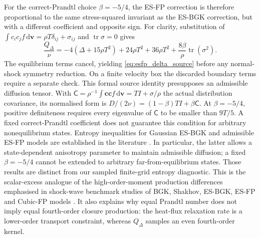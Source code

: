 \documentclass[lineno,paper]{JFM-FLM_Au}
\newenvironment{revision}{\nolinenumbers\begin{tcolorbox}[breakable,colback=revisionyellow,colframe=revisionyellow,boxrule=0pt,arc=0pt,left=5pt,right=5pt,top=5pt,bottom=5pt,before skip=6pt,after skip=6pt]\captionsetup{width=\linewidth}}{\end{tcolorbox}\linenumbers}
\newenvironment{revision}{}{}
\newcommand{\dd}{\mathrm{d}}
\newcommand{\tr}{\operatorname{tr}}
\begin{document}
\begin{revision}
For the correct-Prandtl choice $\beta=-5/4$, the ES-FP correction is therefore proportional to the same stress-squared invariant as the ES-BGK correction, but with a different coefficient and opposite sign. For clarity, substitution of $\int c_ic_jf\,\dd\boldsymbol v=\rho T\delta_{ij}+\sigma_{ij}$ and $\tr\sigma=0$ gives
\[
 \frac{Q_\Delta}{\nu}
 =-4(\Delta+15\rho T^2)+24\rho T^2+36\rho T^2
   +\frac{8\beta}{\rho}\tr(\sigma^2).
\]
The equilibrium terms cancel, yielding \eqref{eq:esfp_delta_source} before any normal-shock symmetry reduction. On a finite velocity box the discarded boundary terms require a separate check. This formal source identity presupposes an admissible diffusion tensor. With $\mathsf C=\rho^{-1}\int\boldsymbol c\boldsymbol c f\,\dd\boldsymbol v=TI+\sigma/\rho$ the actual distribution covariance, its normalised form is $D/(2\nu)=(1-\beta)TI+\beta\mathsf C$. At $\beta=-5/4$, positive definiteness requires every eigenvalue of $\mathsf C$ to be smaller than $9T/5$. A fixed correct-Prandtl coefficient does not guarantee this condition for arbitrary nonequilibrium states.  Entropy inequalities for Gaussian ES-BGK and admissible ES-FP models are established in the literature \citep{Andries2000GaussianBGK,MathiaudMieussens2016ESFP}. In particular, the latter allows a state-dependent anisotropy parameter to maintain admissible diffusion; a fixed $\beta=-5/4$ cannot be extended to arbitrary far-from-equilibrium states. Those results are distinct from our sampled finite-grid entropy diagnostic. This is the scalar-excess analogue of the high-order-moment production differences emphasised in shock-wave benchmark studies of BGK, Shakhov, ES-BGK, ES-FP and Cubic-FP models \citep{FeiLiuLiuZhang2020ShockBenchmark}.  It also explains why equal Prandtl number does not imply equal fourth-order closure production: the heat-flux relaxation rate is a lower-order transport constraint, whereas $Q_\Delta$ samples an even fourth-order kernel.
\end{revision}
\end{document}
